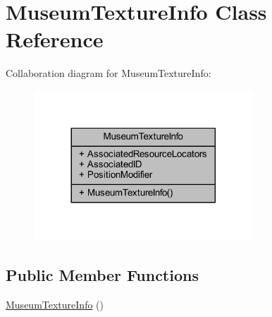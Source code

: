 \hypertarget{class_museum_texture_info}{}\section{Museum\+Texture\+Info Class Reference}
\label{class_museum_texture_info}


Collaboration diagram for Museum\+Texture\+Info\+:\nopagebreak
\begin{figure}[H]
\begin{center}
\leavevmode
\includegraphics[width=233pt]{class_museum_texture_info__coll__graph}
\end{center}
\end{figure}
\subsection*{Public Member Functions}
\begin{DoxyCompactItemize}
\item 
\mbox{\hyperlink{class_museum_texture_info_a930fdf9cdf96752c649660bed901178f}{Museum\+Texture\+Info}} ()
\end{DoxyCompactItemize}
